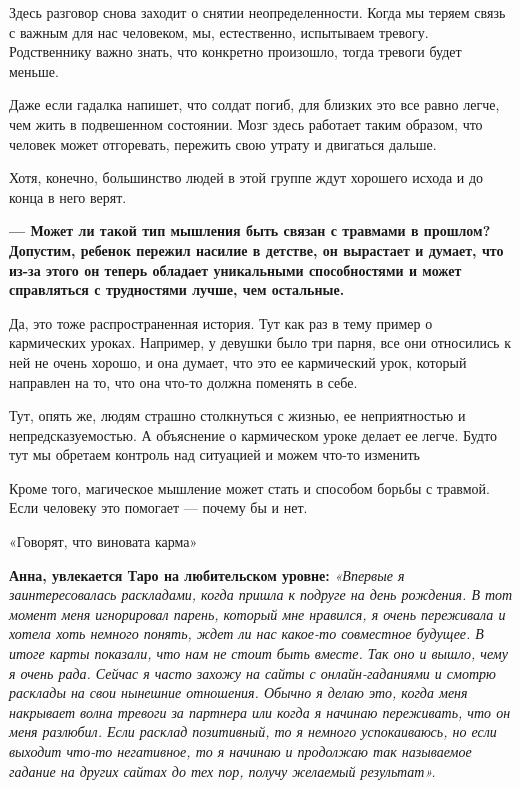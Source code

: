 Здесь разговор снова заходит о снятии неопределенности. Когда мы теряем связь с важным для нас человеком, мы, естественно, испытываем тревогу. Родственнику важно знать, что конкретно произошло, тогда тревоги будет меньше.

Даже если гадалка напишет, что солдат погиб, для близких это все равно легче, чем жить в подвешенном состоянии. Мозг здесь работает таким образом, что человек может отгоревать, пережить свою утрату и двигаться дальше.

Хотя, конечно, большинство людей в этой группе ждут хорошего исхода и до конца в него верят.

\textbf{--- Может ли такой тип мышления быть связан с травмами в прошлом? Допустим, ребенок пережил насилие в детстве, он вырастает и думает, что из-за этого он теперь обладает уникальными способностями и может справляться с трудностями лучше, чем остальные.}

Да, это тоже распространенная история. Тут как раз в тему пример о кармических уроках. Например, у девушки было три парня, все они относились к ней не очень хорошо, и она думает, что это ее кармический урок, который направлен на то, что она что-то должна поменять в себе.

\begin{fancyquotes}
    Тут, опять же, людям страшно столкнуться с жизнью, ее неприятностью и непредсказуемостью. А объяснение о кармическом уроке делает ее легче. Будто тут мы обретаем контроль над ситуацией и можем что-то изменить
\end{fancyquotes}

Кроме того, магическое мышление может стать и способом борьбы с травмой. Если человеку это помогает — почему бы и нет.

\vspace*{1em}
\begin{center}
    \Large «Говорят, что виновата карма»
\end{center}
\vspace*{1em}

\textbf{Анна, увлекается Таро на любительском уровне:} \textit{«Впервые я заинтересовалась раскладами, когда пришла к подруге на день рождения. В тот момент меня игнорировал парень, который мне нравился, я очень переживала и хотела хоть немного понять, ждет ли нас какое-то совместное будущее. В итоге карты показали, что нам не стоит быть вместе. Так оно и вышло, чему я очень рада. Сейчас я часто захожу на сайты с онлайн-гаданиями и смотрю расклады на свои нынешние отношения. Обычно я делаю это, когда меня накрывает волна тревоги за партнера или когда я начинаю переживать, что он меня разлюбил. Если расклад позитивный, то я немного успокаиваюсь, но если выходит что-то негативное, то я начинаю  и продолжаю так называемое гадание на других сайтах до тех пор,  получу желаемый результат». }

